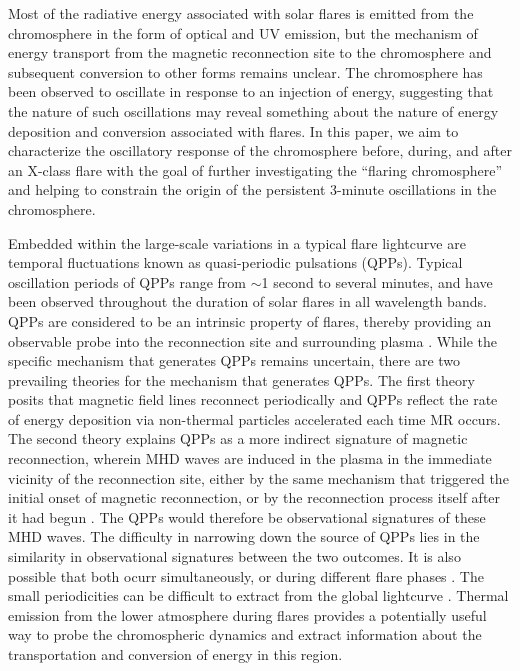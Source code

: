 Most of the radiative energy associated with solar flares
is emitted from the chromosphere
in the form of optical and UV emission, but the mechanism of energy
transport from the magnetic reconnection site to the chromosphere
and subsequent conversion to other forms remains unclear.
The chromosphere has been observed
to oscillate in response to an injection of energy,
suggesting that the nature of such oscillations may reveal
something about the nature of energy deposition and conversion
associated with flares.
In this paper, we aim to characterize the oscillatory response of
the chromosphere before, during, and after an X-class flare
with the goal of
further investigating the ``flaring chromosphere'' and
helping to constrain the origin of the persistent 3-minute oscillations
in the chromosphere.

Embedded within the large-scale variations
in a typical flare lightcurve
are temporal fluctuations known as quasi-periodic pulsations (QPPs).
Typical oscillation periods of QPPs
range from $\sim$1 second to several minutes,
and have been observed throughout the duration of solar flares
in all wavelength bands.
QPPs are considered to be an intrinsic
property of flares, thereby providing an observable
probe into the reconnection site and surrounding plasma
\citep{Inglis2015}.
While the specific mechanism that generates QPPs remains uncertain,
there are two prevailing theories for the mechanism
that generates QPPs.
The first theory posits that magnetic field lines reconnect periodically and
QPPs reflect the rate of energy deposition via
non-thermal particles accelerated each time MR occurs.
The second theory explains QPPs as a more indirect signature of
magnetic reconnection,
wherein MHD waves are induced in the plasma
in the immediate vicinity of the reconnection site,
either by the same mechanism that
triggered the initial onset of magnetic reconnection,
or by the reconnection process itself after it had begun
\citep{Nakariakov2009}.
The QPPs would therefore be observational signatures of these MHD waves.
The difficulty in narrowing down the source of QPPs
lies in the similarity in observational signatures
between the two outcomes.
It is also possible that both ocurr simultaneously, or during
different flare phases \citep{Brosius2016}.
The small periodicities can be difficult to extract from the global
lightcurve \citep{VanDoorsselaere2016}.
Thermal emission from the lower atmosphere during flares provides a potentially
useful way to probe the chromospheric dynamics and extract information about
the transportation and conversion of energy in this region.



